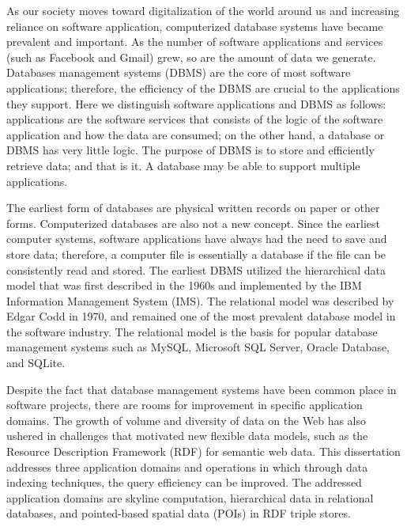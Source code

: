As our society moves toward digitalization of the world around us and increasing reliance on software application, computerized database systems have became prevalent and important. As the number of software applications and services (such as Facebook and Gmail) grew, so are the amount of data we generate. Databases management systems (DBMS) are the core of most software applications; therefore, the efficiency of the DBMS are crucial to the applications they support. Here we distinguish software applications and DBMS as follows: applications are the software services that consists of the logic of the software application and how the data are consumed; on the other hand, a database or DBMS has very little logic. The purpose of DBMS is to store and efficiently retrieve data; and that is it. A database may be able to support multiple applications.

The earliest form of databases are physical written records on paper or other forms. Computerized databases are also not a new concept. Since the earliest computer systems, software applications have always had the need to save and store data; therefore, a computer file is essentially a database if the file can be consistently read and stored. The earliest DBMS utilized the hierarchical data model\cite{hdbms} that was first described in the 1960s and implemented by the IBM Information Management System (IMS)\cite{ims, intro_ims}. The relational model\cite{DBLP:journals/cacm/Codd70} was described by Edgar Codd in 1970, and remained one of the most prevalent database model in the software industry. The relational model is the basis for popular database management systems such as MySQL, Microsoft SQL Server, Oracle Database, and SQLite.

Despite the fact that database management systems have been common place in software projects, there are rooms for improvement in specific application domains. The growth of volume and diversity of data on the Web has also ushered in challenges that motivated new flexible data models, such as the Resource Description Framework (RDF) for semantic web data. This dissertation addresses three application domains and operations in which through data indexing techniques, the query efficiency can be improved. The addressed application domains are skyline computation, hierarchical data in relational databases, and pointed-based spatial data (POIs) in RDF triple stores.

